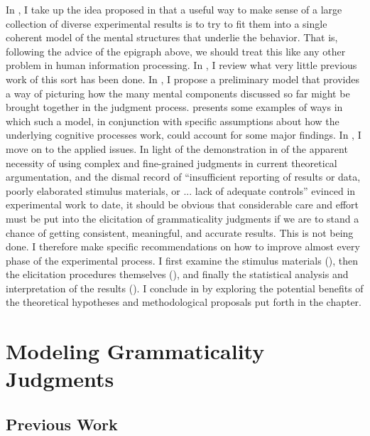 In , I take up the idea proposed in  that a useful way to make sense of a large collection of diverse experimental results is to try to fit them into a single coherent model of the mental structures that underlie the behavior. That is, following the advice of the epigraph above, we should treat this like any other problem in human information processing. In , I review what very little previous work of this sort has been done. In , I propose a 
preliminary model  that provides a way of picturing how the many mental components discussed so far might be brought together in the judgment process.  presents some examples of ways in which such a model, in conjunction with specific assumptions about how the underlying cognitive processes work, could account for some major findings. In , I move on to the applied issues. In light of the demonstration in  of the apparent necessity of using complex and fine-grained judgments in current theoretical argumentation, and the dismal record of ``insufficient reporting of results or data, poorly elaborated stimulus materials, or ... lack of adequate controls'' \citep[367]{Chaudron1983}
evinced in experimental work to date, it should be obvious that considerable care and effort must be put into the elicitation of grammaticality judgments if we are to stand a chance of getting consistent, meaningful, and accurate results. This is not being done. I therefore make specific recommendations on how to improve almost every phase of the experimental process. I first examine the stimulus materials (), then the elicitation procedures themselves (), and finally the statistical analysis and interpretation of the results (). I conclude in  by exploring the potential benefits of the theoretical hypotheses and methodological proposals put forth in the chapter.

\section{Modeling Grammaticality Judgments}\label{sec:6.2}
\subsection{Previous Work}\label{sec:6.2.1}

